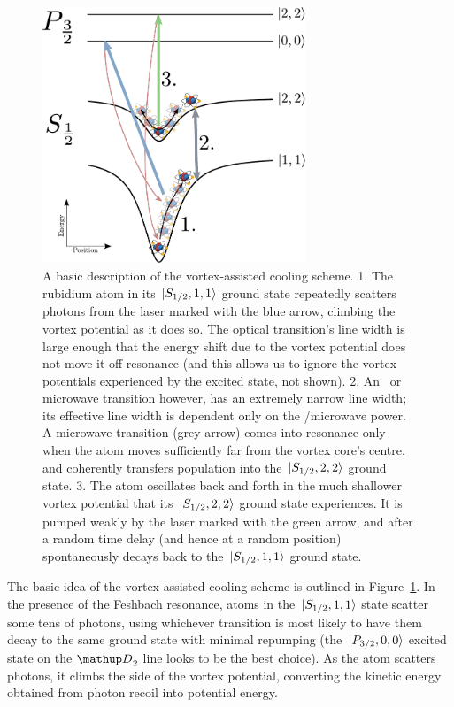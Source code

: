 \begin{figure}
\begin{center}
\includegraphics[width=0.7\textwidth]{figures/unsorted/vortexcooling.pdf}
\caption{A basic description of the vortex-assisted cooling scheme. 1. The rubidium atom in its $\ket{S_{1/2}, 1,1}$ ground state repeatedly scatters photons from the laser marked with the blue arrow, climbing the vortex potential as it does so. The optical transition's line width is large enough that the energy shift due to the vortex potential does not move it off resonance (and this allows us to ignore the vortex potentials experienced by the excited state, not shown). 2. An \rf\ or microwave transition however, has an extremely narrow line width; its effective line width is dependent only on the \rf/microwave power. A microwave transition (grey arrow) comes into resonance only when the atom moves sufficiently far from the vortex core's centre, and coherently transfers population into the $\ket{S_{1/2}, 2,2}$ ground state. 3. The atom oscillates back and forth in the much shallower vortex potential that its $\ket{S_{1/2}, 2,2}$ ground state experiences. It is pumped weakly by the laser marked with the green arrow, and after a random time delay (and hence at a random position) spontaneously decays back to the $\ket{S_{1/2}, 1,1}$ ground state.
}\label{fig:vortexcooling}
\end{center}
\end{figure}

The basic idea of the vortex-assisted cooling scheme is outlined in Figure~\ref{fig:vortexcooling}. In the presence of the Feshbach resonance, atoms in the $\ket{S_{1/2}, 1,1}$ state scatter some tens of photons, using whichever transition is most likely to have them decay to the same ground state with minimal repumping (the $\ket{P_{3/2}, 0,0}$ excited state on the $\up{D}_2$ line looks to be the best choice). As the atom scatters photons, it climbs the side of the vortex potential, converting the kinetic energy obtained from photon recoil into potential energy.


